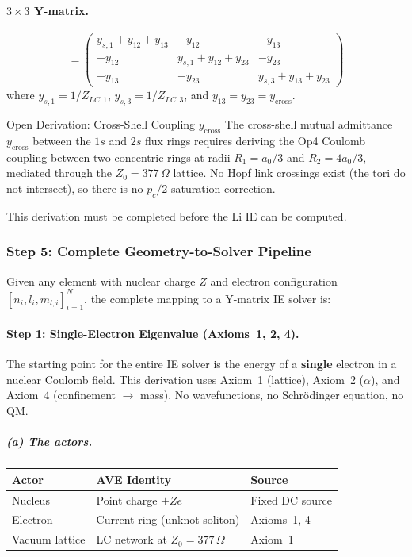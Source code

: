 \paragraph{$3 \times 3$ Y-matrix.}
\begin{equation}
    [Y] = \begin{pmatrix}
    y_{s,1} + y_{12} + y_{13} & -y_{12}   & -y_{13} \\
    -y_{12} & y_{s,1} + y_{12} + y_{23}   & -y_{23} \\
    -y_{13} & -y_{23} & y_{s,3} + y_{13} + y_{23}
    \end{pmatrix}
\end{equation}
where $y_{s,1} = 1/Z_{LC,1}$, $y_{s,3} = 1/Z_{LC,3}$,
and $y_{13} = y_{23} = y_{\text{cross}}$.

\begin{resultbox}{Open Derivation: Cross-Shell Coupling $y_{\text{cross}}$}
The cross-shell mutual admittance $y_{\text{cross}}$ between
the $1s$ and $2s$ flux rings requires deriving the Op4 Coulomb
coupling between two concentric rings at radii $R_1 = a_0/3$
and $R_2 = 4a_0/3$, mediated through the $Z_0 = 377\,\Omega$
lattice. No Hopf link crossings exist (the tori do not intersect),
so there is no $p_c/2$ saturation correction.

This derivation must be completed before the Li IE can be computed.
\end{resultbox}

\subsubsection{Step 5: Complete Geometry-to-Solver Pipeline}
\label{sec:geometry_pipeline}

Given any element with nuclear charge $Z$ and electron
configuration $[n_i, l_i, m_{l,i}]_{i=1}^{N}$, the complete
mapping to a Y-matrix IE solver is:

\paragraph{Step 1: Single-Electron Eigenvalue (Axioms~1, 2, 4).}

The starting point for the entire IE solver is the energy of
a \textbf{single} electron in a nuclear Coulomb field.
This derivation uses Axiom~1 (lattice), Axiom~2 ($\alpha$),
and Axiom~4 (confinement $\to$ mass).  No wavefunctions,
no Schr\"odinger equation, no QM.

\subparagraph{(a) The actors.}
\begin{center}
\small
\begin{tabular}{lll}
\hline
\textbf{Actor} & \textbf{AVE Identity} & \textbf{Source} \\
\hline
Nucleus & Point charge $+Ze$ & Fixed DC source \\
Electron & Current ring (unknot soliton) & Axioms~1, 4 \\
Vacuum lattice & LC network at $Z_0 = 377\,\Omega$ & Axiom~1 \\
\hline
\end{tabular}
\end{center}

